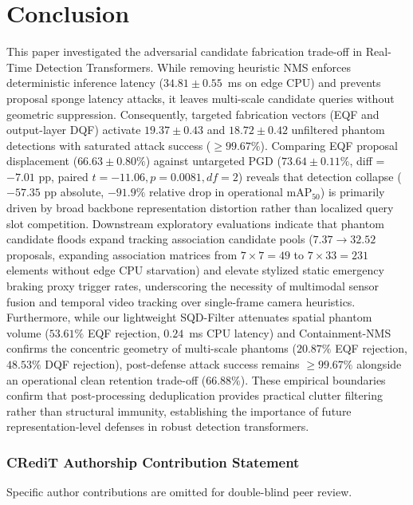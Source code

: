 \documentclass[preprint,12pt]{elsarticle}
\begin{document}
\section{Conclusion}
\label{sec:conclusion}
This paper investigated the adversarial candidate fabrication trade-off in Real-Time Detection Transformers. While removing heuristic NMS enforces deterministic inference latency ($34.81 \pm 0.55$~ms on edge CPU) and prevents proposal sponge latency attacks, it leaves multi-scale candidate queries without geometric suppression. Consequently, targeted fabrication vectors (EQF and output-layer DQF) activate $19.37 \pm 0.43$ and $18.72 \pm 0.42$ unfiltered phantom detections with saturated attack success ($\ge 99.67\%$). Comparing EQF proposal displacement ($66.63 \pm 0.80\%$) against untargeted PGD ($73.64 \pm 0.11\%$, diff = $-7.01\text{ pp}$, paired $t = -11.06, p = 0.0081, df = 2$) reveals that detection collapse ($-57.35\text{ pp}$ absolute, $-91.9\%$ relative drop in operational $\mathrm{mAP}_{50}$) is primarily driven by broad backbone representation distortion rather than localized query slot competition. Downstream exploratory evaluations indicate that phantom candidate floods expand tracking association candidate pools ($7.37 \to 32.52$ proposals, expanding association matrices from $7\times 7=49$ to $7\times 33=231$ elements without edge CPU starvation) and elevate stylized static emergency braking proxy trigger rates, underscoring the necessity of multimodal sensor fusion and temporal video tracking over single-frame camera heuristics. Furthermore, while our lightweight SQD-Filter attenuates spatial phantom volume ($53.61\%$ EQF rejection, $0.24$~ms CPU latency) and Containment-NMS confirms the concentric geometry of multi-scale phantoms ($20.87\%$ EQF rejection, $48.53\%$ DQF rejection), post-defense attack success remains $\ge 99.67\%$ alongside an operational clean retention trade-off ($66.88\%$). These empirical boundaries confirm that post-processing deduplication provides practical clutter filtering rather than structural immunity, establishing the importance of future representation-level defenses in robust detection transformers.

\subsubsection*{CRediT Authorship Contribution Statement}
Specific author contributions are omitted for double-blind peer review.
\end{document}
